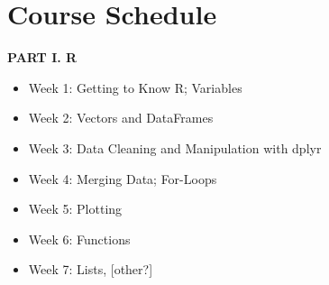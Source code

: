 \documentclass[12pt]{article}
\begin{document}
%
%
%
%
%
%
%
%
%

\section{Course Schedule}


\vspace{.4in}
\begin{center}
	\textbf{PART I. R}
\end{center}
\vspace{.2in}

\begin{itemize}
	\item Week 1: Getting to Know R; Variables
	\item Week 2: Vectors and DataFrames
	\item Week 3: Data Cleaning and Manipulation with dplyr
	\item Week 4: Merging Data; For-Loops
	\item Week 5: Plotting
	\item Week 6: Functions
	\item Week 7: Lists, [other?]
\end{itemize}
\end{document}
